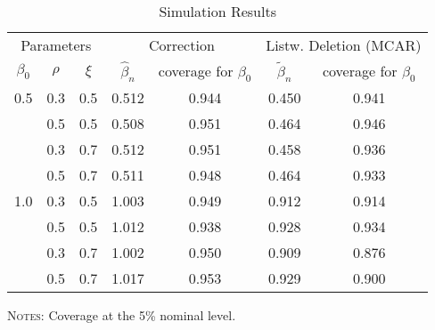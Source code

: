 
\begin{table}[ht]
\centering
\caption{Simulation Results \label{tab_simulation}}
\begin{tabular}{ccc|cc|cc}
  \hline   \hline
\multicolumn{3}{c}{Parameters}  & \multicolumn{2}{c}{Correction} & \multicolumn{2}{c}{Listw. Deletion (MCAR)} \\
$\beta_0$   & $\rho$ & $\xi$    & $\widehat{\beta}_n$   & coverage for $\beta_0$    & $\widetilde{\beta}_n$   & coverage for $\beta_0$ \\
  \hline
  0.5       &  0.3   &   0.5    & 0.512            & 0.944                      & 0.450            & 0.941 \\
       		  &  0.5   &   0.5    & 0.508            & 0.951                      & 0.464            & 0.946 \\
       		  &  0.3   &   0.7    & 0.512            & 0.951                      & 0.458            & 0.936 \\
       		 &  0.5   &   0.7    & 0.511            & 0.948                      & 0.464            & 0.933 \\
       		 \hline
  1.0       &  0.3   &   0.5    & 1.003            & 0.949                      & 0.912            & 0.914 \\
  		       &  0.5   &   0.5    & 1.012            & 0.938                      & 0.928            & 0.934 \\
 		       &  0.3   &   0.7    & 1.002            & 0.950                      & 0.909            & 0.876 \\
 		     &  0.5   &   0.7    & 1.017            & 0.953                      &  0.929            & 0.900 \\
   \hline   \hline
\end{tabular}
\vspace{2mm}\parbox{14.5cm}{\scriptsize{{\scshape Notes:} \scriptsize{Coverage at the 5\% nominal level.}}}
\end{table}
